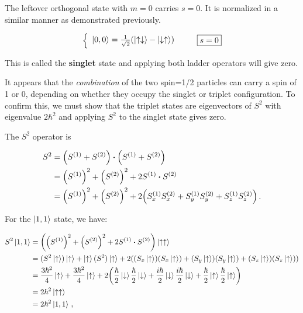 \documentclass[12pt, titlepage]{article}
\begin{document}
The leftover orthogonal state with $m=0$ carries $s=0$. It is normalized in a similar manner as demonstrated previously. 

\begin{equation}
	\left\{
	\begin{array}{l}
	\ket{0,0} = \frac{1}{\sqrt{2}}(\ket{\uparrow\downarrow} - \ket{\downarrow\uparrow})
	\end{array}
	\right.
	\qquad \boxed{s=0}
\end{equation}

This is called the \textbf{singlet} state and applying both ladder operators will give zero.

It appears that the \textit{combination} of the two spin=1/2 particles can carry a spin of 1 or 0, depending on whether they occupy the singlet or triplet configuration. To confirm this, we must show that the triplet states are eigenvectors of $S^2$ with eigenvalue $2\hbar^2$ and applying $S^2$ to the singlet state gives zero.

The $S^2$ operator is

\begin{align}
	S^2 &= \qty(S^{(1)} + S^{(2)})\vdot\qty(S^{(1)} + S^{(2)}) \nonumber \\
	&= \qty(S^{(1)})^2 + \qty(S^{(2)})^2 + 2 S^{(1)}\vdot S^{(2)} \nonumber \\
	&= \qty(S^{(1)})^2 + \qty(S^{(2)})^2 + 2\qty(S_{x}^{(1)}S_{x}^{(2)} + S_{y}^{(1)}S_{y}^{(2)} + S_{z}^{(1)}S_{z}^{(2)}) \,.
\end{align}

For the $\ket{1,1}$ state, we have:

\begin{align*}
	S^2\ket{1,1} &= \qty(\qty(S^{(1)})^2 + \qty(S^{(2)})^2 + 2S^{(1)}\vdot S^{(2)})\ket{\uparrow\uparrow} \\
	&= (S^2\ket{\uparrow})\ket{\uparrow} + \ket{\uparrow}(S^2)\ket{\uparrow} + 2\qty((S_x\ket{\uparrow})(S_x\ket{\uparrow}) + (S_y\ket{\uparrow})(S_y\ket{\uparrow}) + (S_z\ket{\uparrow})(S_z\ket{\uparrow})) \\
	&= \frac{3\hbar^2}{4}\ket{\uparrow} + \frac{3\hbar^2}{4}\ket{\uparrow} + 2\qty(\frac{\hbar}{2}\ket{\downarrow}\frac{\hbar}{2}\ket{\downarrow} + \frac{i\hbar}{2}\ket{\downarrow}\frac{i\hbar}{2}\ket{\downarrow} + \frac{\hbar}{2}\ket{\uparrow}\frac{\hbar}{2}\ket{\uparrow}) \\
	&= 2\hbar^2\ket{\uparrow\uparrow} \\
	&= 2\hbar^2\ket{1,1} \,,
\end{align*}
\end{document}
